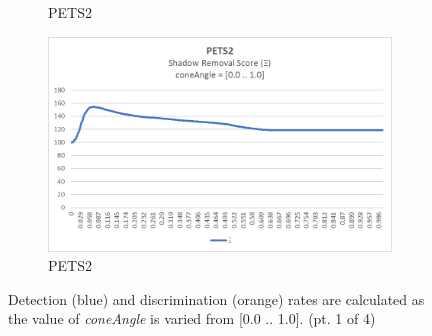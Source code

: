 \begin{appendices}
\begin{figure}
\begin{subfigure}{.45\linewidth}
  \caption{PETS2}
\end{subfigure}
\hfill
\begin{subfigure}{.45\linewidth}
  \includegraphics[width=1\linewidth]{figures/appendix/pets2_coneAngle_score.jpg}
  \caption{PETS2}
\end{subfigure}

\caption{Detection (blue) and discrimination (orange) rates are calculated as the value of \textit{coneAngle} is varied from [0.0 .. 1.0]. (pt. 1 of 4)}
\end{figure}


\end{appendices}
